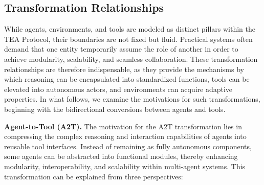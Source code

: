 \documentclass[11pt]{article}
\begin{document}



\subsection{Transformation Relationships}

While agents, environments, and tools are modeled as distinct pillars within the TEA Protocol, their boundaries are not fixed but fluid. Practical systems often demand that one entity temporarily assume the role of another in order to achieve modularity, scalability, and seamless collaboration. These transformation relationships are therefore indispensable, as they provide the mechanisms by which reasoning can be encapsulated into standardized functions, tools can be elevated into autonomous actors, and environments can acquire adaptive properties. In what follows, we examine the motivations for such transformations, beginning with the bidirectional conversions between agents and tools.

\textbf{Agent-to-Tool (A2T).} The motivation for the A2T transformation lies in compressing the complex reasoning and interaction capabilities of agents into reusable tool interfaces. Instead of remaining as fully autonomous components, some agents can be abstracted into functional modules, thereby enhancing modularity, interoperability, and scalability within multi-agent systems. This transformation can be explained from three perspectives:  
\end{document}
